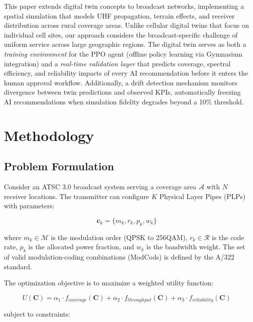 \documentclass[conference]{IEEEtran}
\begin{document}
This paper extends digital twin concepts to broadcast networks, implementing a spatial simulation that models UHF propagation, terrain effects, and receiver distribution across rural coverage areas. Unlike cellular digital twins that focus on individual cell sites, our approach considers the broadcast-specific challenge of uniform service across large geographic regions. The digital twin serves as both a \textit{training environment} for the PPO agent (offline policy learning via Gymnasium integration) and a \textit{real-time validation layer} that predicts coverage, spectral efficiency, and reliability impacts of every AI recommendation before it enters the human approval workflow. Additionally, a drift detection mechanism monitors divergence between twin predictions and observed KPIs, automatically freezing AI recommendations when simulation fidelity degrades beyond a 10\% threshold.

\section{Methodology}

\subsection{Problem Formulation}

Consider an ATSC 3.0 broadcast system serving a coverage area $\mathcal{A}$ with $N$ receiver locations. The transmitter can configure $K$ Physical Layer Pipes (PLPs) with parameters:

\begin{equation}
\mathbf{c}_k = \{m_k, r_k, p_k, w_k\}
\end{equation}

where $m_k \in \mathcal{M}$ is the modulation order (QPSK to 256QAM), $r_k \in \mathcal{R}$ is the code rate, $p_k$ is the allocated power fraction, and $w_k$ is the bandwidth weight. The set of valid modulation-coding combinations (ModCods) is defined by the A/322 standard.

The optimization objective is to maximize a weighted utility function:

\begin{equation}
U(\mathbf{C}) = \alpha_1 \cdot f_{coverage}(\mathbf{C}) + \alpha_2 \cdot f_{throughput}(\mathbf{C}) + \alpha_3 \cdot f_{reliability}(\mathbf{C})
\end{equation}

subject to constraints:
\end{document}
